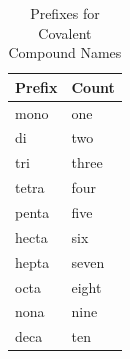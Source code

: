 \documentclass[11pt,addpoints]{exam}   	%
\begin{document}
\begin{table}
\centering
\begin{tabular}[p]{| l | l |}
\hline
\textbf{Prefix} & \textbf{Count} \\
\hline
mono & one \\
di       & two \\
tri       & three \\
tetra       & four \\
penta       & five \\
hecta       & six \\
hepta       & seven \\
octa       & eight \\
nona       & nine \\
deca       & ten \\
\end{tabular}
\caption{Prefixes for Covalent Compound Names}
\label{table:covalent-prefix}
\end{table}
\end{document}
